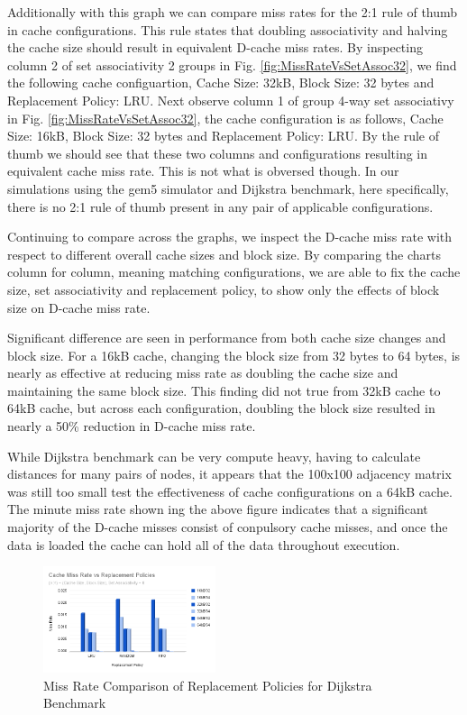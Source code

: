 \documentclass[conference]{IEEEtran}
\begin{document}
Additionally with this graph we can compare miss rates for the 2:1 rule of thumb in cache configurations. This rule states that doubling associativity and halving the cache size should result in equivalent D-cache miss rates. By inspecting column 2 of set associativity 2 groups in Fig. \ref{fig:MissRateVsSetAssoc32}, we find the following cache configuartion, Cache Size: 32kB, Block Size: 32 bytes and Replacement Policy: LRU. Next observe column 1 of group 4-way set associativy in Fig. \ref{fig:MissRateVsSetAssoc32}, the cache configuration is as follows, Cache Size: 16kB, Block Size: 32 bytes and Replacement Policy: LRU. By the rule of thumb we should see that these two columns and configurations resulting in equivalent cache miss rate. This is not what is obversed though. In our simulations using the gem5 simulator and Dijkstra benchmark, here specifically, there is no 2:1 rule of thumb present in any pair of applicable configurations.

Continuing to compare across the graphs, we inspect the D-cache miss rate with respect to different overall cache sizes and block size. By comparing the charts column for column, meaning matching configurations, we are able to fix the cache size, set associativity and replacement policy, to show only the effects of block size on D-cache miss rate. 

Significant difference are seen in performance from both cache size changes and block size. For a 16kB cache, changing the block size from 32 bytes to 64 bytes, is nearly as effective at reducing miss rate as doubling the cache size and maintaining the same block size. This finding did not true from 32kB cache to 64kB cache, but across each configuration, doubling the block size resulted in nearly a 50\% reduction in D-cache miss rate.

While Dijkstra benchmark can be very compute heavy, having to calculate distances for many pairs of nodes, it appears that the 100x100 adjacency matrix was still too small test the effectiveness of cache configurations on a 64kB cache. The minute miss rate shown ing the above figure indicates that a significant majority of the D-cache misses consist of conpulsory cache misses, and once the data is loaded the cache can hold all of the data throughout execution.


\begin{figure}[H]
  \centering
  \includegraphics[width=0.45\textwidth]{dijkstraFigures/CacheMissRatevsReplacementPolicies.png}
  \caption{Miss Rate Comparison of Replacement Policies for Dijkstra Benchmark}
  \label{fig:MissRateVsReplPolicy}
\end{figure}
\end{document}
